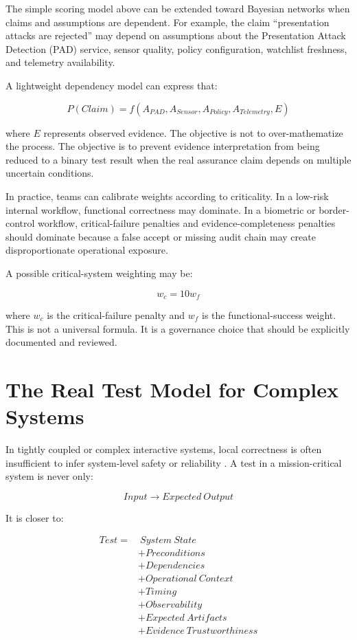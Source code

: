 \documentclass[11pt,a4paper]{article}
\begin{document}
The simple scoring model above can be extended toward Bayesian networks when claims and assumptions are dependent. For example, the claim ``presentation attacks are rejected'' may depend on assumptions about the Presentation Attack Detection (PAD) service, sensor quality, policy configuration, watchlist freshness, and telemetry availability.

A lightweight dependency model can express that:

\[
P(Claim) = f(A_{PAD}, A_{Sensor}, A_{Policy}, A_{Telemetry}, E)
\]

where \(E\) represents observed evidence. The objective is not to over-mathematize the process. The objective is to prevent evidence interpretation from being reduced to a binary test result when the real assurance claim depends on multiple uncertain conditions.

In practice, teams can calibrate weights according to criticality. In a low-risk internal workflow, functional correctness may dominate. In a biometric or border-control workflow, critical-failure penalties and evidence-completeness penalties should dominate because a false accept or missing audit chain may create disproportionate operational exposure.

A possible critical-system weighting may be:

\[
w_c = 10w_f
\]

where \(w_c\) is the critical-failure penalty and \(w_f\) is the functional-success weight. This is not a universal formula. It is a governance choice that should be explicitly documented and reviewed.

\section{The Real Test Model for Complex Systems}

In tightly coupled or complex interactive systems, local correctness is often insufficient to infer system-level safety or reliability \cite{perrow,hollnagel}. A test in a mission-critical system is never only:

\[
Input \rightarrow Expected\ Output
\]

It is closer to:

\[
\begin{aligned}
Test = &\ System\ State \\
& + Preconditions \\
& + Dependencies \\
& + Operational\ Context \\
& + Timing \\
& + Observability \\
& + Expected\ Artifacts \\
& + Evidence\ Trustworthiness
\end{aligned}
\]
\end{document}

